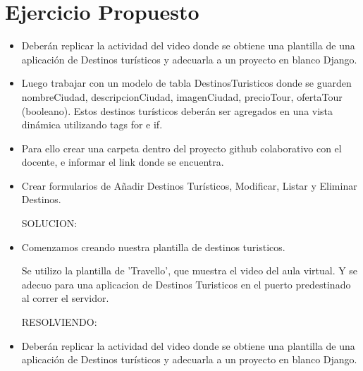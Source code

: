 \documentclass{article}
\begin{document}
	\section{Ejercicio Propuesto}
	\begin{itemize}		

 
        \item Deberán replicar la actividad del video donde se obtiene una plantilla de una aplicación de Destinos turísticos y adecuarla a un proyecto en blanco Django.
        \item Luego trabajar con un modelo de tabla DestinosTuristicos donde se guarden nombreCiudad, descripcionCiudad, imagenCiudad, precioTour, ofertaTour (booleano). Estos destinos turísticos deberán ser agregados en una vista dinámica utilizando tags for e if.
        \item Para ello crear una carpeta dentro del proyecto github colaborativo con el docente, e informar el link donde se encuentra.
        \item Crear formularios de Añadir Destinos Turísticos, Modificar, Listar y Eliminar Destinos.

        \bigskip
        \bigskip
        \bigskip
        \bigskip
        \bigskip
        \bigskip
        \bigskip
        \bigskip
        \bigskip
        \bigskip
        \bigskip
        \bigskip
        \bigskip
        \bigskip
        \bigskip
        \bigskip
        \bigskip
        \bigskip
        \bigskip
        \bigskip
        \bigskip
        \bigskip
        \bigskip
        \bigskip
        \bigskip
        \bigskip
        \bigskip
        \bigskip
        \bigskip
        \bigskip
        \bigskip
        \bigskip
        \bigskip
        \bigskip
        \bigskip
        \bigskip
        \bigskip
        \bigskip
        \bigskip
        \bigskip
        \bigskip
        SOLUCION:

        \item Comenzamos creando nuestra plantilla de destinos turisticos.

        Se utilizo la plantilla de 'Travello', que muestra el video del aula virtual. Y se adecuo para una aplicacion de Destinos Turisticos en el puerto predestinado al correr el servidor.
     

        RESOLVIENDO:

        \item Deberán replicar la actividad del video donde se obtiene una plantilla de una aplicación de Destinos turísticos y adecuarla a un proyecto en blanco Django.
      


\end{itemize}
\end{document}
